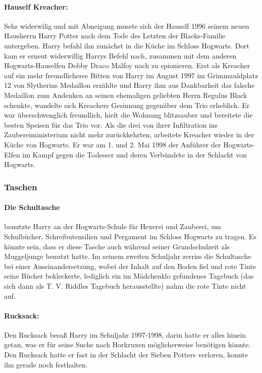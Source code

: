\documentclass[a4paper, 10pt]{article}
\begin{document}
\paragraph{Hauself Kreacher:}
Sehr widerwilig und mit Abneigung musste sich der Hauself 1996 seinem neuen Hausherrn Harry Potter nach dem Tode des Letzten der Blacks-Familie untergeben. Harry befahl ihn zunächst in die Küche im Schloss Hogwarts. Dort kam er erneut widerwillig Harrys Befehl nach, zusammen mit dem anderen Hogwarts-Hauselfen Dobby Draco Malfoy nach zu spionieren. Erst als Kreacher auf ein mehr freundlicheres Bitten von Harry im August 1997 im Grimmauldplatz 12 von Slytherins Medaillon erzählte und Harry ihm aus Dankbarkeit das falsche Medaillon zum Andenken an seinen ehemaligen geliebten Herrn Regulus Black schenkte, wandelte sich Kreachers Gesinnung gegenüber dem Trio erheblich. Er war überschwenglich freundlich, hielt die Wohnung blitzsauber und bereitete die besten Speisen für das Trio vor. Als die drei von ihrer Infiltration ins Zaubereiministerium nicht mehr zurückkehrten, arbeitete Kreacher wieder in der Küche von Hogwarts. Er war am 1. und 2. Mai 1998 der Anführer der Hogwarts-Elfen im Kampf gegen die Todesser und deren Verbündete in der Schlacht von Hogwarts.

\subsubsection*{\large Taschen}
\paragraph{Die Schultasche}
benutzte Harry an der Hogwarts-Schule für Hexerei und Zauberei, um Schulbücher, Schreibutensilien und Pergament im Schloss Hogwarts zu tragen. Es könnte sein, dass er diese Tasche auch während seiner Grundschulzeit als Muggeljunge benutzt hatte. Im seinem zweiten Schuljahr zerriss die Schultasche bei einer Auseinandersetzung, wobei der Inhalt auf den Boden fiel und rote Tinte seine Bücher bekleckerte, lediglich ein im Mädchenklo gefundenes Tagebuch (das sich dann als T. V. Riddles Tagebuch herausstellte) nahm die rote Tinte nicht auf.
\paragraph{Rucksack:}
Den Rucksack besaß Harry im Schuljahr 1997-1998, darin hatte er alles hinein getan, was er für seine Suche nach Horkruxen möglicherweise benötigen könnte. Den Rucksack hatte er fast in der Schlacht der Sieben Potters verloren, konnte ihn gerade noch festhalten.
\end{document}
